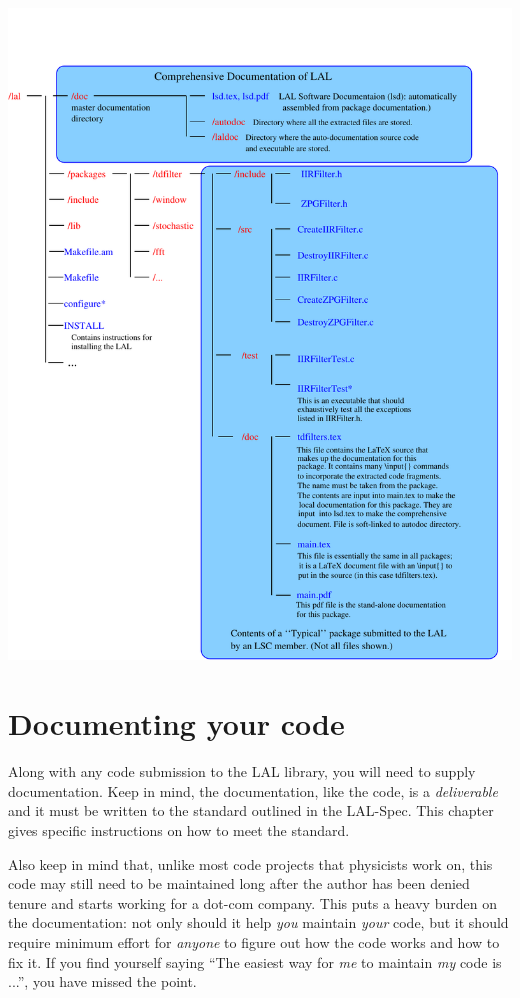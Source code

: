 \documentclass[oneside]{book}
\begin{document}
\noindent\includegraphics[width=0.9\linewidth,angle=0]{lsdFigDirStructure}

\chapter{Documenting your code}
\label{c:DocumentingCode}

Along with any code submission to the LAL library, you will need to
supply documentation. Keep in mind, the documentation, like the code,
is a {\it deliverable} and it must be written to the standard outlined
in the LAL-Spec.  This chapter gives specific instructions  on how
to meet the standard.

Also keep in mind that, unlike most code projects that physicists work
on, this code may still need to be maintained long after the author
has been denied tenure and starts working for a dot-com company.  This
puts a heavy burden on the documentation: not only should it help {\it
you} maintain {\it your} code, but it should require minimum effort
for {\it anyone} to figure out how the code works and how to fix it.
If you find yourself saying ``The easiest way for {\it me} to maintain
{\it my} code is ...'', you have missed the point.
\end{document}
